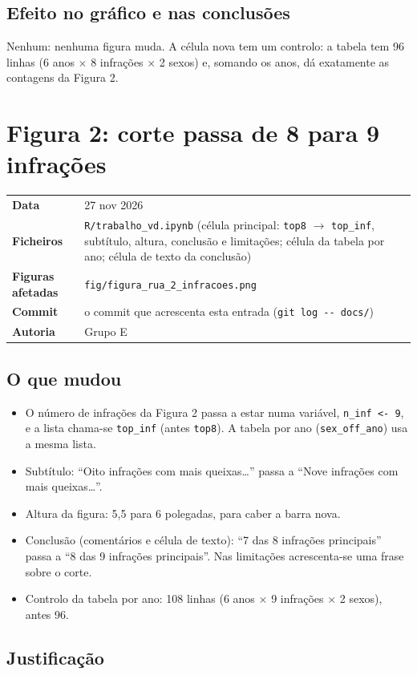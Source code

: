 \documentclass[11pt,a4paper]{article}
\makeatletter
\newcommand{\ficha}[5]{%
  \begin{center}
  \colorbox{fundo}{\begin{minipage}{0.95\linewidth}\small
  \begin{tabular}{@{}p{3.2cm}p{11.8cm}@{}}
  \textbf{Data} & #1\\
  \textbf{Ficheiros} & #2\\
  \textbf{Figuras afetadas} & #3\\
  \textbf{Commit} & #4\\
  \textbf{Autoria} & #5\\
  \end{tabular}
  \end{minipage}}
  \end{center}}
\makeatother
\begin{document}
\subsection*{Efeito no gráfico e nas conclusões}

Nenhum: nenhuma figura muda. A célula nova tem um controlo: a tabela tem 96 linhas
(6 anos $\times$ 8 infrações $\times$ 2 sexos) e, somando os anos, dá exatamente as contagens
da Figura 2.

\section{Figura 2: corte passa de 8 para 9 infrações}

\ficha{27 nov 2026}
      {\texttt{R/trabalho\_vd.ipynb} (célula principal: \texttt{top8} $\to$ \texttt{top\_inf}, subtítulo,
       altura, conclusão e limitações; célula da tabela por ano; célula de texto da conclusão)}
      {\texttt{fig/figura\_rua\_2\_infracoes.png}}
      {o commit que acrescenta esta entrada (\texttt{git log -{}- docs/})}
      {Grupo E}

\subsection*{O que mudou}

\begin{itemize}
  \item O número de infrações da Figura 2 passa a estar numa variável, \texttt{n\_inf <- 9}, e a
        lista chama-se \texttt{top\_inf} (antes \texttt{top8}). A tabela por ano
        (\texttt{sex\_off\_ano}) usa a mesma lista.
  \item Subtítulo: ``Oito infrações com mais queixas\ldots'' passa a ``Nove infrações com mais queixas\ldots''.
  \item Altura da figura: 5,5 para 6 polegadas, para caber a barra nova.
  \item Conclusão (comentários e célula de texto): ``7 das 8 infrações principais'' passa a
        ``8 das 9 infrações principais''. Nas limitações acrescenta-se uma frase sobre o corte.
  \item Controlo da tabela por ano: 108 linhas (6 anos $\times$ 9 infrações $\times$ 2 sexos), antes 96.
\end{itemize}

\subsection*{Justificação}
\end{document}
